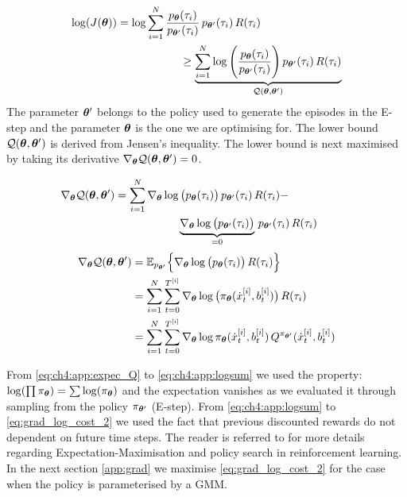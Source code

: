 \begin{appendices}
\begin{align}
  \log( J(\boldsymbol{\theta}) )  &= \log \sum\limits_{i=1}^{N} \frac{p_{\boldsymbol{\theta}}(\tau_i)}{p_{\boldsymbol{\theta}'}(\tau_i)} \, p_{\boldsymbol{\theta}'}(\tau_i) \, R(\tau_i) \hspace*{2cm}  \nonumber \\
		     & \hspace*{2cm} \geq \underbrace{\sum\limits_{i=1}^{N} \log\Bigg( \frac{p_{\boldsymbol{\theta}}(\tau_i)}{p_{\boldsymbol{\theta}'}(\tau_i)}\Bigg) \, p_{\boldsymbol{\theta}'}(\tau_i) \, R(\tau_i)}_{\mathcal{Q}(\boldsymbol{\theta},\boldsymbol{\theta}')} \label{eq:lower_bound}
\end{align}
The parameter $\boldsymbol{\theta}'$ belongs to the policy used to generate the episodes in the E-step and the parameter $\boldsymbol{\theta}$ is the one 
we are optimising for. The lower bound $\mathcal{Q}(\boldsymbol{\theta},\boldsymbol{\theta}')$ is derived from Jensen's inequality. 
The lower bound is next maximised by taking its derivative $\nabla_{\boldsymbol{\theta}}\mathcal{Q}(\boldsymbol{\theta},\boldsymbol{\theta}') = 0$. 

\begin{align}
 \nabla_{\boldsymbol{\theta}}\mathcal{Q}(\boldsymbol{\theta},\boldsymbol{\theta}')& = \sum\limits_{i=1}^{N} \nabla_{\boldsymbol{\theta}} \log\big( p_{\boldsymbol{\theta}}(\tau_i)\big) \, p_{\boldsymbol{\theta}'}(\tau_i) \, R(\tau_i) - \hspace*{2cm} \nonumber \\
				    &\hspace*{2cm}\underbrace{\nabla_{\boldsymbol{\theta}} \log\big( p_{\boldsymbol{\theta}'}(\tau_i)\big)}_{=0} \, p_{\boldsymbol{\theta}'}(\tau_i) \, R(\tau_i)				   
\end{align}
\begin{align}
 \nabla_{\boldsymbol{\theta}}\mathcal{Q}(\boldsymbol{\theta},\boldsymbol{\theta}') &= \mathbb{E}_{p_{\boldsymbol{\theta}'}} \Big\{ \nabla_{\boldsymbol{\theta}} \log\big( p_{\boldsymbol{\theta}}(\tau_i)\big)\, R(\tau_i) \Big\} \label{eq:ch4:app:expec_Q}\\
					    &= \sum\limits_{i=1}^{N} \sum\limits_{t=0}^{T^{[i]}} \nabla_{\boldsymbol{\theta}} \log\big( \pi_{\boldsymbol{\theta}}(\dot{x}^{[i]}_t,b^{[i]}_t)\big) \, R(\tau_i) \label{eq:ch4:app:logsum} \\
					    &= \sum\limits_{i=1}^{N} \sum\limits_{t=0}^{T^{[i]}} \nabla_{\boldsymbol{\theta}}\log \pi_{\boldsymbol{\theta}}(\dot{x}^{[i]}_t,b^{[i]}_t) \, Q^{\pi_{\boldsymbol{\theta}'}}(\dot{x}^{[i]}_t,b^{[i]}_t) \label{eq:grad_log_cost_2}
\end{align}

From \ref{eq:ch4:app:expec_Q} to \ref{eq:ch4:app:logsum} we used the property: $\log( \prod \pi_{\boldsymbol{\theta}} ) = \sum \log(\pi_{\boldsymbol{\theta}})$ and 
the expectation vanishes as we evaluated it through sampling from the policy $\pi_{\boldsymbol{\theta}'}$ (E-step). From \ref{eq:ch4:app:logsum} to \ref{eq:grad_log_cost_2} 
we used the fact that previous discounted rewards do not dependent on future time steps. The reader is referred 
to \cite[p. 50]{rl_gradient_survey_2013} for more details regarding Expectation-Maximisation and policy search in reinforcement learning.
In the next section \ref{app:grad} we maximise \ref{eq:grad_log_cost_2} for the case when the policy is parameterised by a GMM.



\end{appendices}
